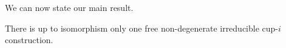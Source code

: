 We can now state our main result.

\begin{theorem} \label{t:main}
	There is up to isomorphism only one free non-degenerate irreducible cup-$i$ construction.
\end{theorem}


%

%
%


